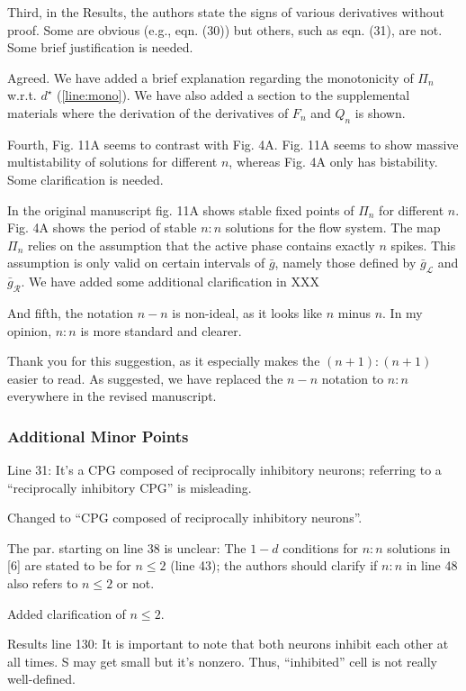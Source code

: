 \documentclass{ar2rc}
\begin{document}
\RC
Third, in the Results, the authors state the signs of various derivatives without proof. Some are obvious (e.g., eqn. (30)) but others, such as eqn. (31), are not. Some brief justification is needed.

\AR
Agreed.
We have added a brief explanation regarding the monotonicity of $\Pi_{n}$ w.r.t. $d^{\star}$ (\ref{line:mono}).
We have also added a section to the supplemental materials where the derivation of the derivatives of $F_{n}$ and $Q_{n}$ is shown.

\RC
Fourth, Fig. 11A seems to contrast with Fig. 4A. Fig. 11A seems to show massive multistability of solutions for different $n$, whereas Fig. 4A only has bistability. Some clarification is needed.

\AR
In the original manuscript fig. 11A shows stable fixed points of $\Pi_{n}$ for different $n$.
Fig. 4A shows the period of stable $n:n$ solutions for the flow system. The map $\Pi_{n}$ relies on the assumption that the active phase contains exactly $n$ spikes. This assumption is only valid on certain intervals of $\bar g$, namely those defined by $\bar g_{\mathcal{L}}$ and $\bar g_{\mathcal{R}}$. We have added some additional clarification in XXX

\RC
And fifth, the notation $n-n$ is non-ideal, as it looks like $n$ minus $n$. In my opinion, $n:n$ is more standard and clearer.

\AR
Thank you for this suggestion, as it especially makes the $(n+1):(n+1)$ easier to read. As suggested, we have replaced the $n-n$ notation to $n:n$ everywhere in the revised manuscript.

\subsubsection{Additional Minor Points}

\RC
Line 31: It’s a CPG composed of reciprocally inhibitory neurons; referring to a ``reciprocally inhibitory CPG'' is misleading.

\AR
Changed to ``CPG composed of reciprocally inhibitory neurons''.

\RC
The par. starting on line 38 is unclear:
The $1-d$ conditions for $n:n$ solutions in [6] are stated to be for $n\leq 2$ (line 43); the authors should clarify if $n:n$ in line 48 also refers to $n \leq 2$ or not.

\AR
Added clarification of $n\leq 2$.

\RC
Results line 130: It is important to note that both neurons inhibit each other at all times. S may get small but it’s nonzero. Thus, “inhibited” cell is not really well-defined.
\end{document}
